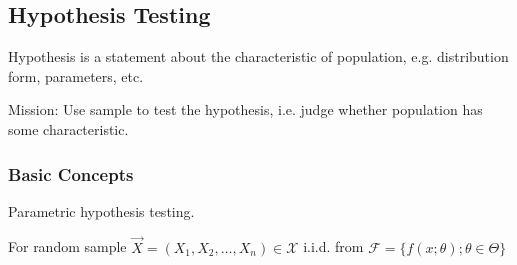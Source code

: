 \documentclass[11pt,a4paper]{ctexart}
\numberwithin{equation}{section}%
\begin{document}
\subsection{Hypothesis Testing}\label{SectionHypothesisTesting}
    Hypothesis is a statement about the characteristic of population, e.g. distribution form, parameters, etc. 
    
    Mission: Use sample to test the hypothesis, i.e. judge whether population has some characteristic.

\subsubsection{Basic Concepts}\label{SubSectionHypothesisTestingBasicConcepts}
    Parametric hypothesis testing.

    For random sample $\vec{X}=(X_1,X_2,\ldots,X_n)\in\mathscr{X}$ i.i.d. from $\mathscr{F}=\{f(x;\theta);\theta\in\Theta\}$
\end{document}
